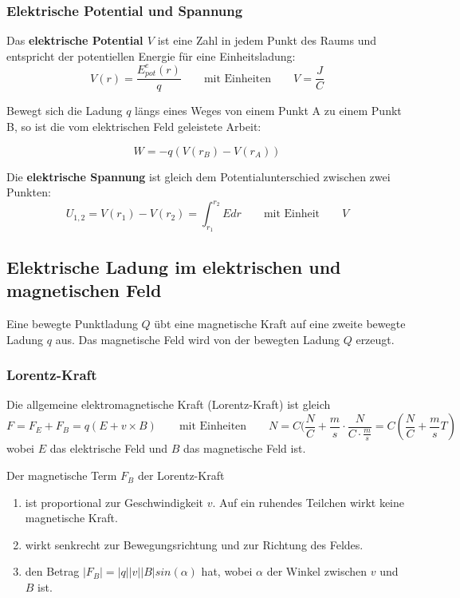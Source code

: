 \documentclass[11pt]{article}
\begin{document}
\subsubsection{Elektrische Potential und Spannung}

Das \textbf{elektrische Potential $V$} ist eine Zahl in jedem Punkt des Raums und entspricht der potentiellen Energie f{\"u}r eine Einheitsladung:
\begin{equation*}
	V(r) = \frac{E_{pot}^e(r)}{q} \qquad\text{mit Einheiten}\qquad V = \frac{J}{C}
\end{equation*}

Bewegt sich die Ladung $q$ l{\"a}ngs eines Weges von einem Punkt A zu einem Punkt B, so ist die vom elektrischen Feld geleistete Arbeit:

\begin{equation*}
	W = -q(V(r_B) - V(r_A))
\end{equation*}

Die \textbf{elektrische Spannung} ist gleich dem Potentialunterschied zwischen zwei Punkten:
\begin{equation*}
	U_{1,2} = V(r_1) - V(r_2) = \int_{r_1}^{r_2}E dr \qquad\text{mit Einheit}\qquad V
\end{equation*}

\subsection{Elektrische Ladung im elektrischen und magnetischen Feld}

Eine bewegte Punktladung $Q$ übt eine magnetische Kraft auf eine zweite bewegte Ladung $q$ aus. Das magnetische Feld wird von der bewegten Ladung $Q$ erzeugt.

\subsubsection{Lorentz-Kraft}

Die allgemeine elektromagnetische Kraft (Lorentz-Kraft) ist gleich
\begin{equation*}
	F = F_E + F_B = q(E + v \times B) \qquad\text{mit Einheiten}\qquad N = C(\frac{N}{C} + \frac{m}{s}\cdot\frac{N}{C\cdot\frac{m}{s}} = C(\frac{N}{C} + \frac{m}{s}T)
\end{equation*}
wobei $E$ das elektrische Feld und $B$ das magnetische Feld ist. 

Der magnetische Term $F_B$ der Lorentz-Kraft
\begin{enumerate}
	\item ist proportional zur Geschwindigkeit $v$. Auf ein ruhendes Teilchen wirkt keine magnetische Kraft.
	\item wirkt senkrecht zur Bewegungsrichtung und zur Richtung des Feldes.
	\item den Betrag $|F_B| = |q||v||B|sin(\alpha)$ hat, wobei $\alpha$ der Winkel zwischen $v$ und $B$ ist.
\end{enumerate}
\end{document}
